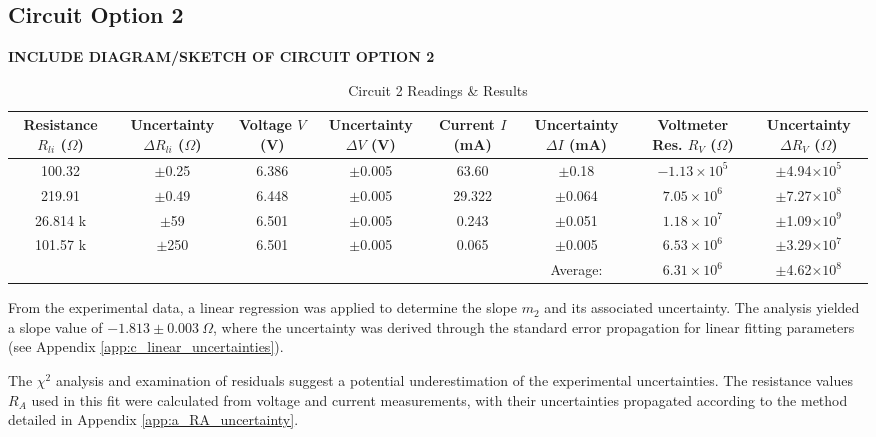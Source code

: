 \documentclass{article} %
\begin{document}
\subsection{Circuit Option 2}
\textbf{INCLUDE DIAGRAM/SKETCH OF CIRCUIT OPTION 2}
\begin{table}[htbp]
\centering
\caption{Circuit 2 Readings \& Results}
\begin{tabular}{|c|c|c|c|c|c|c|c|}
\hline
\makecell{Resistance \\ $R_{li}$ ($\Omega$)} & \makecell{Uncertainty \\ $\Delta R_{li}$ ($\Omega$)} & \makecell{Voltage \\ $V$ (V)} & \makecell{Uncertainty \\ $\Delta V$ (V)} & \makecell{Current \\ $I$ (mA)} & \makecell{Uncertainty \\ $\Delta I$ (mA)} & \makecell{Voltmeter Res. \\ $R_V$ ($\Omega$)} & \makecell{Uncertainty \\ $\Delta R_V$ ($\Omega$)} \\
\hline
100.32 & $\pm$0.25 & 6.386 & $\pm$0.005 & 63.60 & $\pm$0.18 & $-1.13 \times 10^5$ & $\pm$4.94$\times 10^5$ \\
\hline
219.91 & $\pm$0.49 & 6.448 & $\pm$0.005 & 29.322 & $\pm$0.064 & $7.05 \times 10^6$ & $\pm$7.27$\times 10^8$ \\
\hline
26.814 k & $\pm$59 & 6.501 & $\pm$0.005 & 0.243 & $\pm$0.051 & $1.18 \times 10^7$ & $\pm$1.09$\times 10^9$ \\
\hline
101.57 k & $\pm$250 & 6.501 & $\pm$0.005 & 0.065 & $\pm$0.005 & $6.53 \times 10^6$ & $\pm$3.29$\times 10^7$ \\
\hline
\cellcolor{gray!50} & \cellcolor{gray!50} & \cellcolor{gray!50} & \cellcolor{gray!50} & \cellcolor{gray!50} & Average: & $6.31 \times 10^6$ & $\pm$4.62$\times 10^8$ \\
\hline
\end{tabular}
\end{table}

From the experimental data, a linear regression was applied to determine the slope $m_2$ and its associated uncertainty. 
The analysis yielded a slope value of $-1.813 \pm 0.003~\Omega$, where the uncertainty was derived through the standard error propagation for linear fitting parameters (see Appendix \ref{app:c_linear_uncertainties}).

The $\chi^2$ analysis and examination of residuals suggest a potential underestimation of the experimental uncertainties. 
The resistance values $R_A$ used in this fit were calculated from voltage and current measurements, with their uncertainties propagated according to the method detailed in Appendix \ref{app:a_RA_uncertainty}.
\end{document}
